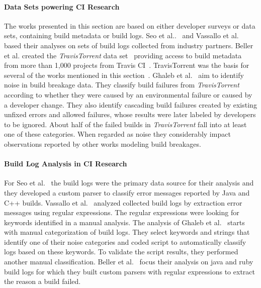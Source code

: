\documentclass[\myrootdir/main.tex]{subfiles}
\begin{document}
\paragraph{Data Sets powering CI Research}
The works presented in this section are based on either developer surveys or data sets, containing build metadata or build logs.
Seo et al..~\cite{seo2014programmers} and Vassallo et al.~\cite{vassallo2017a-tale} based their analyses on sets of build logs collected from industry partners.
Beller et al. created the \emph{TravisTorrent} data set~\cite{beller2017travistorrent} providing access to build metadata from more than 1,000 projects from Travis CI~\cite{travisci2019webpage}.
TravisTorrent was the basis for several of the works mentioned in this section~\cite{rausch2017empirical,zampetti2017open,vassallo2017a-tale,beller2017oops}.
Ghaleb et al.~\cite{ghaleb2019studying} aim to identify noise in build breakage data.
They classify build failures from \emph{TravisTorrent} according to whether they were caused by an environmental failure or caused by a developer change.
They also identify cascading build failures created by existing unfixed errors and allowed failures, whose results were later labeled by developers to be ignored.
About half of the failed builds in \emph{TravisTorrent} fall into at least one of these categories.
When regarded as noise they considerably impact observations reported by other works modeling build breakages.

\paragraph{Build Log Analysis in CI Research}
For Seo et al.~\cite{seo2014programmers} the build logs were the primary data source for their analysis and they developed a custom parser to classify error messages reported by Java and C++ builds. 
Vassallo et al.~\cite{vassallo2017a-tale} analyzed collected build logs by extraction error messages using regular expressions.
The regular expressions were looking for keywords identified in a manual analysis.
The analysis of Ghaleb et al.~\cite{ghaleb2019studying} starts with manual categorization of build logs.
They select keywords and strings that identify one of their noise categories and coded script to automatically classify logs based on these keywords.
To validate the script results, they performed another manual classification.
Beller et al.~\cite{beller2017oops} focus their analysis on java and ruby build logs for which they built custom parsers with regular expressions to extract the reason a build failed.
\end{document}
